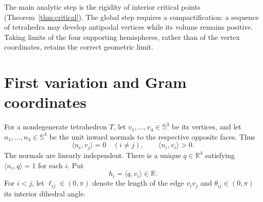 \documentclass[11pt,reqno]{amsart}
\theoremstyle{remark}
\newcommand{\Sph}{\mathbb S}
\newcommand{\R}{\mathbb R}
\newcommand{\ip}[2]{\langle #1,#2\rangle}
\begin{document}
The main analytic step is the rigidity of interior critical points (Theorem~\ref{thm:critical}). The global step requires a compactification: a sequence of tetrahedra may develop antipodal vertices while its volume remains positive. Taking limits of the four supporting hemispheres, rather than of the vertex coordinates, retains the correct geometric limit.

\section{First variation and Gram coordinates}\label{sec:variation}

For a nondegenerate tetrahedron $T$, let $v_1,\ldots,v_4\in\Sph^3$ be its vertices, and let $n_1,\ldots,n_4\in\Sph^3$ be the unit inward normals to the respective opposite faces. Thus
\begin{equation}\label{eq:dual-normals}
 \ip{n_i}{v_j}=0\quad (i\ne j),\qquad \ip{n_i}{v_i}>0.
\end{equation}
The normals are linearly independent. There is a unique $q\in\R^4$ satisfying $\ip{n_i}{q}=1$ for each $i$. Put
\begin{equation}\label{eq:height}
 h_i=\ip{q}{v_i}\in\R.
\end{equation}
For $i<j$, let $\ell_{ij}\in(0,\pi)$ denote the length of the edge $v_iv_j$ and $\theta_{ij}\in(0,\pi)$ its interior dihedral angle.
\end{document}

